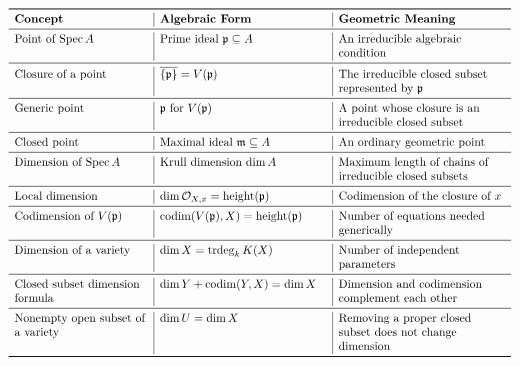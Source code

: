 \documentclass[12pt,a4paper]{article}
\DeclareMathOperator{\Spec}{Spec}
\newcommand{\codim}{\operatorname{codim}}
\newcommand{\trdeg}{\operatorname{trdeg}}
\newcommand{\height}{\operatorname{height}}
\providecommand{\Spec}{\operatorname{Spec}}
\theoremstyle{notespace}
\begin{document}
\[
\begin{array}{>{\raggedright\arraybackslash}p{4cm}
		|>{\raggedright\arraybackslash}p{5cm}
		|>{\raggedright\arraybackslash}p{5cm}}
	\toprule
	\textbf{Concept}
	&
	\textbf{Algebraic Form}
	&
	\textbf{Geometric Meaning}
	\\
	\midrule
	
	Point of \(\Spec A\)
	&
	Prime ideal \(\mathfrak p\subseteq A\)
	&
	An irreducible algebraic condition
	\\
	
	\midrule
	
	Closure of a point
	&
	\(\overline{\{\mathfrak p\}}=V(\mathfrak p)\)
	&
	The irreducible closed subset represented by \(\mathfrak p\)
	\\
	
	\midrule
	
	Generic point
	&
	\(\mathfrak p\) for \(V(\mathfrak p)\)
	&
	A point whose closure is an irreducible closed subset
	\\
	
	\midrule
	
	Closed point
	&
	Maximal ideal \(\mathfrak m\subseteq A\)
	&
	An ordinary geometric point
	\\
	
	\midrule
	
	Dimension of \(\Spec A\)
	&
	Krull dimension \(\dim A\)
	&
	Maximum length of chains of irreducible closed subsets
	\\
	
	\midrule
	
	Local dimension
	&
	\(\dim \mathcal O_{X,x}=\height(\mathfrak p)\)
	&
	Codimension of the closure of \(x\)
	\\
	
	\midrule
	
	Codimension of \(V(\mathfrak p)\)
	&
	\(\codim(V(\mathfrak p),X)=\height(\mathfrak p)\)
	&
	Number of equations needed generically
	\\
	
	\midrule
	
	Dimension of a variety
	&
	\(\dim X=\trdeg_k K(X)\)
	&
	Number of independent parameters
	\\
	
	\midrule
	
	Closed subset dimension formula
	&
	\(\dim Y+\codim(Y,X)=\dim X\)
	&
	Dimension and codimension complement each other
	\\
	
	\midrule
	
	Nonempty open subset of a variety
	&
	\(\dim U=\dim X\)
	&
	Removing a proper closed subset does not change dimension
	\\
	
	\bottomrule
\end{array}
\]
\end{document}
